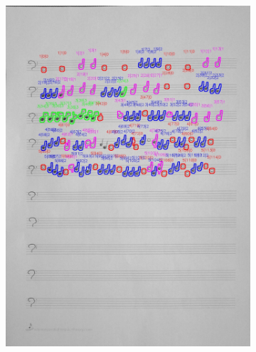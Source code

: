 \documentclass[11pt]{article}
\begin{document}
\begin{figure}[H]
    \centering
    \begin{subfigure}{.5\textwidth}
        \centering
        \graphicspath{ {blobs/} }
        \includegraphics[width=\linewidth]{6_cnts.jpg}
        \label{fig:sub1}
    \end{subfigure}%
    \begin{subfigure}{.5\textwidth}
        \centering
        \graphicspath{ {blobs/} }

\end{subfigure}
\end{figure}
\end{document}
